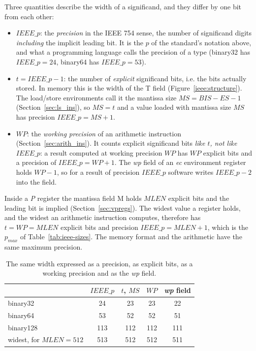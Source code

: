 Three quantities describe the width of a significand, and they differ by one bit from each other:

\begin{itemize}[topsep=0pt]
\item $IEEE\_p$: the \emph{precision} in the IEEE 754 sense, the number of significand digits \emph{including} the implicit leading bit.
It is the $p$ of the standard's notation above, and what a programming language calls the precision of a type (binary32 has $IEEE\_p = 24$, binary64 has $IEEE\_p = 53$).
\item $t = IEEE\_p - 1$: the number of \emph{explicit} significand bits, i.e. the bits actually stored.
In memory this is the width of the T field (Figure~\ref{ieee:structure}).
The load/store environments call it the mantissa size $MS = BIS - ES - 1$ (Section~\ref{sec:ls_ins}), so $MS = t$ and a value loaded with mantissa size $MS$ has precision $IEEE\_p = MS + 1$.
\item $WP$: the \emph{working precision} of an arithmetic instruction (Section~\ref{sec:arith_ins}).
It counts explicit significand bits \emph{like $t$, not like $IEEE\_p$}: a result computed at working precision $WP$ has $WP$ explicit bits and a precision of $IEEE\_p = WP + 1$.
The {\em wp} field of an {\em ec} environment register holds $WP - 1$, so for a result of precision $IEEE\_p$ software writes $IEEE\_p - 2$ into the field.
\end{itemize}

Inside a {\em P} register the mantissa field M holds $MLEN$ explicit bits and the leading bit is implied (Section~\ref{sec:vpregs}).
The widest value a register holds, and the widest an arithmetic instruction computes, therefore has $t = WP = MLEN$ explicit bits and precision $IEEE\_p = MLEN + 1$, which is the $p_{max}$ of Table~\ref{tab:ieee-sizes}.
The memory format and the arithmetic have the same maximum precision.

\begin{table}[htbp]
\begin{center}
\begin{tabular}{l|c|c|c|c}
                         & $IEEE\_p$ & $t$, $MS$ & $WP$ & {\em wp} field \\ \hline
binary32                 & 24        & 23        & 23   & 22 \\
binary64                 & 53        & 52        & 52   & 51 \\
binary128                & 113       & 112       & 112  & 111 \\
widest, for $MLEN = 512$ & 513       & 512       & 512  & 511 \\
\end{tabular}
\caption{The same width expressed as a precision, as explicit bits, as a working precision and as the {\em wp} field.}
\label{tab:precision-names}
\end{center}
\end{table}

